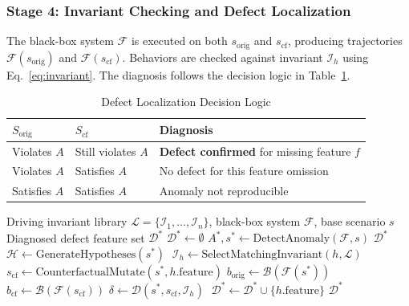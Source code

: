\documentclass[conference]{IEEEtran}
\theoremstyle{plain}
\begin{document}
\subsubsection{Stage 4: Invariant Checking and Defect Localization}
The black-box system $\mathcal{F}$ is executed on both $s_{\text{orig}}$ and $s_{\text{cf}}$, producing trajectories $\mathcal{F}(s_{\text{orig}})$ and $\mathcal{F}(s_{\text{cf}})$. Behaviors are checked against invariant $\mathcal{I}_h$ using Eq.\ \eqref{eq:invariant}. The diagnosis follows the decision logic in Table~\ref{tab:decision}.

\begin{table}[h]
\centering
\caption{Defect Localization Decision Logic}
\label{tab:decision}
\begin{tabular}{llp{3.5cm}}
\toprule
\textbf{$S_{\text{orig}}$} & \textbf{$S_{\text{cf}}$} & \textbf{Diagnosis} \\
\midrule
Violates $A$ & Still violates $A$ & \cellcolor{blue!10}\textbf{Defect confirmed} for missing feature $f$ \\
Violates $A$ & Satisfies $A$ & No defect for this feature omission \\
Satisfies $A$ & Satisfies $A$ & Anomaly not reproducible \\
\bottomrule
\end{tabular}
\end{table}

\begin{algorithm}[h]
\caption{Counterfactual Defect Localization}
\label{alg:localization}
\begin{algorithmic}[1]
\Require Driving invariant library $\mathcal{L} = \{\mathcal{I}_1, \ldots, \mathcal{I}_n\}$, 
         black-box system $\mathcal{F}$, base scenario $s$
\Ensure Diagnosed defect feature set $\mathcal{D}^*$
\State $\mathcal{D}^* \gets \emptyset$
\State $A^*, s^* \gets \text{DetectAnomaly}(\mathcal{F}, s)$
    \State \Return $\mathcal{D}^*$
\EndIf
\State $\mathcal{H} \gets \text{GenerateHypotheses}(s^*)\;$ 
    \State $\mathcal{I}_h \gets \text{SelectMatchingInvariant}(h, \mathcal{L})$
    \State $s_{\text{cf}} \gets \text{CounterfactualMutate}(s^*, h.\text{feature})$
    \State $b_{\text{orig}} \gets \mathcal{B}(\mathcal{F}(s^*))$
    \State $b_{\text{cf}} \gets \mathcal{B}(\mathcal{F}(s_{\text{cf}}))$
    \State $\delta \gets \mathcal{D}(s^*, s_{\text{cf}}, \mathcal{I}_h)\;$ 
        \State $\mathcal{D}^* \gets \mathcal{D}^* \cup \{h.\text{feature}\}$
    \EndIf
\EndFor
\State \Return $\mathcal{D}^*$
\end{algorithmic}
\end{algorithm}
\end{document}
